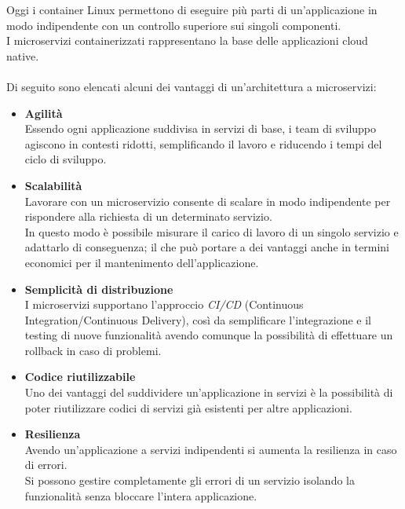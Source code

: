 Oggi i container Linux permettono di eseguire più parti di un'applicazione in modo indipendente con un controllo superiore sui singoli componenti.\\
I microservizi containerizzati rappresentano la base delle applicazioni cloud native.\\ \\
Di seguito sono elencati alcuni dei vantaggi di un'architettura a microservizi:

\begin{itemize}
	\item \textbf{Agilità}\\ Essendo ogni applicazione suddivisa in servizi di base, i team di sviluppo agiscono in contesti ridotti, semplificando il lavoro e riducendo i tempi del ciclo di sviluppo.
	\item \textbf{Scalabilità}\\Lavorare con un microservizio consente di scalare in modo indipendente per rispondere alla richiesta di un determinato servizio.\\ In questo modo è possibile misurare il carico di lavoro di un singolo servizio e adattarlo di conseguenza; il che può portare a dei vantaggi anche in termini economici per il mantenimento dell'applicazione. 
	\item \textbf{Semplicità di distribuzione}\\ I microservizi supportano l'approccio \emph{CI/CD} (Continuous Integration/Continuous Delivery), così da semplificare l'integrazione e il testing di nuove funzionalità avendo comunque la possibilità di effettuare un rollback in caso di problemi.
	\item \textbf{Codice riutilizzabile}\\ Uno dei vantaggi del suddividere un'applicazione in servizi è la possibilità di poter riutilizzare codici di servizi già esistenti per altre applicazioni.
	\item \textbf{Resilienza}\\ Avendo un'applicazione a servizi indipendenti si aumenta la resilienza in caso di errori.\\ Si possono gestire completamente gli errori di un servizio isolando la funzionalità senza bloccare l'intera applicazione.
\end{itemize}

